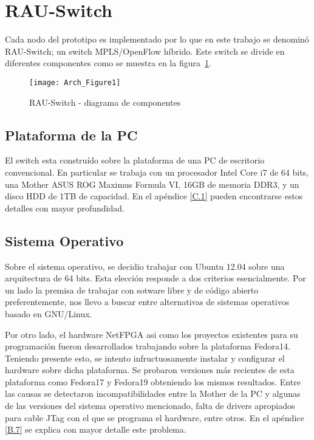 \section{RAU-Switch}
Cada nodo del prototipo es implementado por lo que en este trabajo se denomin\'o RAU-Switch; un switch MPLS/OpenFlow híbrido. Este switch se divide en diferentes componentes como se muestra en la figura~\ref{fig:OpenSourceRArch}.

\newpage
\begin{figure}[htbp!] 
\centering    
\texttt{[image: Arch\_Figure1]}
\caption[RAU-Switch - diagrama de componentes]{RAU-Switch - diagrama de componentes}
\label{fig:OpenSourceRArch}
\end{figure}

\subsection{Plataforma de la PC}
El switch esta constru\'ido sobre la plataforma de una PC de escritorio convencional. En particular se trabaja con un procesador Intel Core i7 de 64 bits, una Mother ASUS ROG Maximus Formula VI, 16GB de memoria DDR3, y un disco HDD de 1TB de capacidad. En el apéndice \ref{C.1} pueden encontrarse estos detalles con mayor profundidad.

\subsection{Sistema Operativo}
Sobre el sistema operativo, se decidio trabajar con Ubuntu 12.04 sobre una arquitectura de 64 bits. Esta elecci\'on responde a dos criterios esencialmente. Por un lado la premisa de trabajar con sotware libre y de c\'odigo abierto preferentemente, nos llevo a buscar entre alternativas de sistemas operativos basado en GNU/Linux.

Por otro lado, el hardware NetFPGA asi como los proyectos existentes para su programaci\'on fueron desarrollados trabajando sobre la plataforma Fedora14. Teniendo presente esto, se intento infructuosamente instalar y configurar el hardware sobre dicha plataforma. Se probaron versiones m\'as recientes de esta plataforma como Fedora17 y Fedora19 obteniendo los mismos resultados. Entre las causas se detectaron incompatibilidades entre la Mother de la PC y algunas de las versiones del sistema operativo mencionado, falta de drivers apropiados para cable JTag con el que se programa el hardware, entre otros. En el apéndice \ref{B.7} se explica con mayor detalle este problema.

